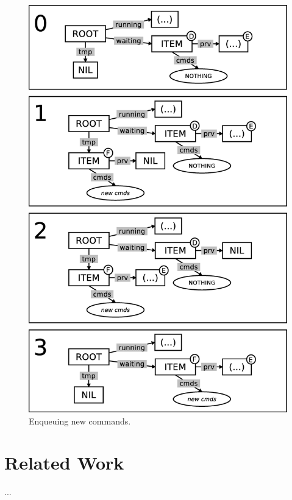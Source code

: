 \documentclass{sig-alternate}
\begin{document}
\begin{figure}[t]
\centering
\includegraphics[scale=0.26]{queue-fig-2.eps}
\caption{
Enqueuing new commands.
\label{fig.queue-2}
}
\end{figure}

\section{Related Work}

...

\end{document}

